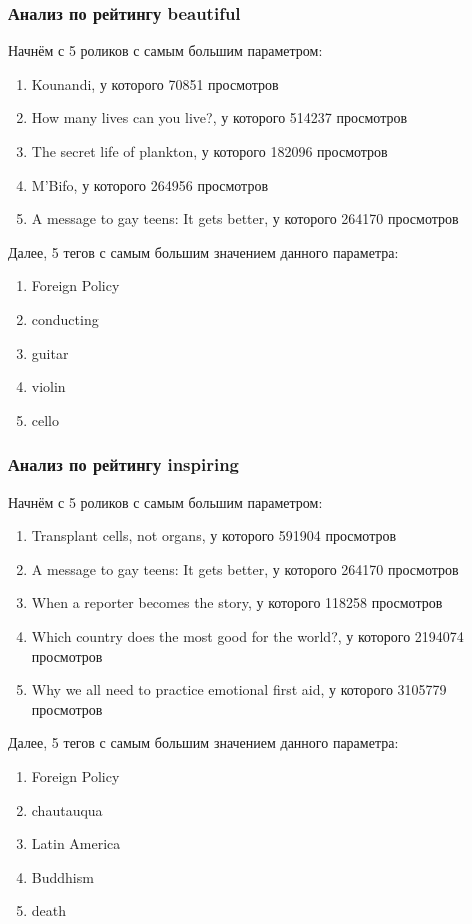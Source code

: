 \documentclass[12pt,a4paper]{scrartcl}
\begin{document}
\subsubsection{Анализ по рейтингу beautiful}
Начнём с 5 роликов с самым большим параметром: 
\begin{enumerate}
\item Kounandi, у которого 70851 просмотров
\item How many lives can you live?, у которого 514237 просмотров
\item The secret life of plankton, у которого 182096 просмотров
\item M'Bifo, у которого 264956 просмотров
\item A message to gay teens: It gets better, у которого 264170 просмотров
\end{enumerate}
Далее, 5 тегов с самым большим значением данного параметра:
\begin{enumerate}
\item Foreign Policy
\item conducting
\item guitar
\item violin
\item cello
\end{enumerate}
\subsubsection{Анализ по рейтингу inspiring}
Начнём с 5 роликов с самым большим параметром: 
\begin{enumerate}
\item Transplant cells, not organs, у которого 591904 просмотров
\item A message to gay teens: It gets better, у которого 264170 просмотров
\item When a reporter becomes the story, у которого 118258 просмотров
\item Which country does the most good for the world?, у которого 2194074 просмотров
\item Why we all need to practice emotional first aid, у которого 3105779 просмотров
\end{enumerate}
Далее, 5 тегов с самым большим значением данного параметра:
\begin{enumerate}
\item Foreign Policy
\item chautauqua
\item Latin America
\item Buddhism
\item death
\end{enumerate}
\end{document}
